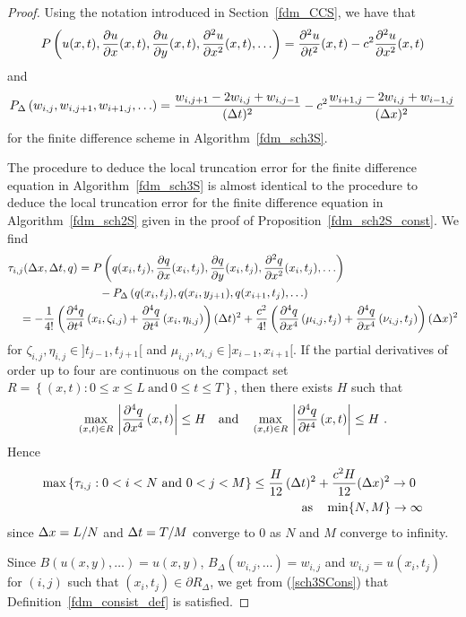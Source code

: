 \begin{proof}
Using the notation introduced in Section~\ref{fdm_CCS}, we have that
\[
P\left(u(x,t), \frac{\partial{u}}{\partial{x}}(x,t), \frac{\partial{u}}{\partial{y}}(x,t),
  \frac{\partial^{2}{u}}{\partial{x}^{2}}(x,t), \ldots \right)
= \frac{\partial^{2}{u}}{\partial{t}^{2}}(x,t) - c^2 \frac{\partial^{2}{u}}{\partial{x}^{2}}(x,t)
\]
and
\[
P_\Delta\left(w_{i,j}, w_{i,j+1}, w_{i+1,j}, \ldots\right)
= \frac{w_{i,j+1} - 2w_{i,j} + w_{i,j-1}}{(\Delta{t})^2}
- c^2 \frac{w_{i+1,j} - 2w_{i,j} + w_{i-1,j}}{(\Delta{x})^2}
\]
for the finite difference scheme in Algorithm~\ref{fdm_sch3S}.

The procedure to deduce the local truncation error for the finite
difference equation in Algorithm~\ref{fdm_sch3S} is almost identical to
the procedure to deduce the local truncation error for the finite
difference equation in Algorithm~\ref{fdm_sch2S} given in the proof of
Proposition~\ref{fdm_sch2S_const}.  We find
\begin{align*}
&\tau_{i,j}(\Delta{x},\Delta{t},q) = 
P\left(q(x_i,t_j), \frac{\partial{q}}{\partial{x}}(x_i,t_j), \frac{\partial{q}}{\partial{y}}(x_i,t_j),
  \frac{\partial^{2}{q}}{\partial{x}^{2}}(x_i,t_j), \ldots \right) \\
&\qquad\qquad\qquad\qquad
- P_\Delta\left(q(x_i,t_j), q(x_i,y_{j+1}), q(x_{i+1},t_j), \ldots\right) \\
& \quad
= - \frac{1}{4!} \left( \frac{\partial^{4}{q}}{\partial{t}^{4}}\left(x_i,\zeta_{i,j} \right)
+ \frac{\partial^{4}{q}}{\partial{t}^{4}}\left(x_i,\eta_{i,j} \right) \right) (\Delta{t})^2
+ \frac{c^2}{4!} \left( \frac{\partial^{4}{q}}{\partial{x}^{4}}\left(\mu_{i,j},t_j\right)
+ \frac{\partial^{4}{q}}{\partial{x}^{4}}\left(\nu_{i,j},t_j\right) \right) (\Delta{x})^2
\end{align*}
for $\zeta_{i,j} , \eta_{i,j} \in ]t_{j-1},t_{j+1}[$ and
$\mu_{i,j} ,\nu_{i,j} \in ]x_{i-1},x_{i+1}[$.
If the partial derivatives of order up to four are continuous on the
compact set
$\displaystyle R = \left\{ (x,t) : 0 \leq x \leq L \ \text{and} \ 0 \leq
t \leq T \right\}$, then there exists $H$
such that
\[
\max_{(x,t)\in R}\, \left|\frac{\partial^{4}{q}}{\partial{x}^{4}}\left(x,t\right) \right| \leq
H \quad \text{and} \quad 
\max_{(x,t)\in R}\, \left|\frac{\partial^{4}{q}}{\partial{t}^{4}}\left(x,t\right) \right| \leq
H \ .
\]
Hence
\begin{equation} \label{sch3SCons}
\begin{split}
\max \left\{ \tau_{i,j} : 0<i<N \ \text{and} \ 0<j < M \right\}
& \leq \frac{H}{12}\,(\Delta{t})^2 + \frac{c^2 H}{12} (\Delta{x})^2 \rightarrow 0 \\
&\qquad\qquad \text{as} \quad \min \{N, M\} \rightarrow \infty
\end{split}
\end{equation}
since $\Delta{x} = L/N$ and $\Delta{t} = T/M$ converge to $0$ as $N$ and
$M$ converge to infinity.

Since $\displaystyle B\left(u(x,y), \ldots \right) = u(x,y)$,
$\displaystyle B_\Delta(w_{i,j},\ldots) = w_{i,j}$ and $w_{i,j} = u(x_i,t_j)$
for $(i,j)$ such that $(x_i,t_j) \in \partial R_\Delta$, we get from 
(\ref{sch3SCons}) that Definition~\ref{fdm_consist_def} is satisfied.
\end{proof}

